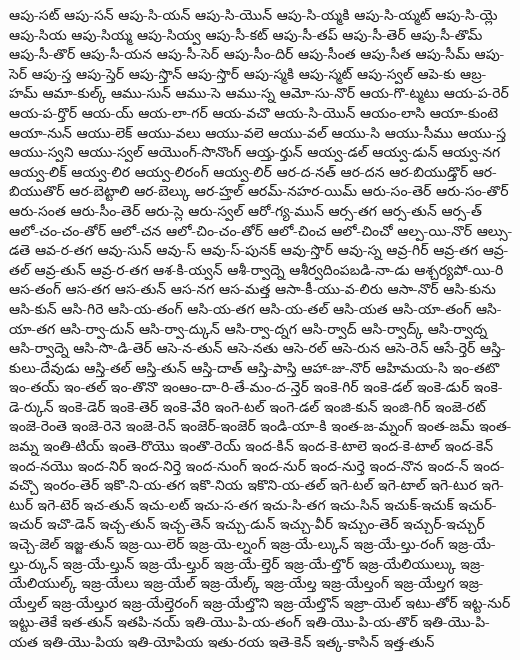 {ఆపు-సట్
ఆపు-సన్
ఆపు-సి-యన్
ఆపు-సి-యొన్
ఆపు-సి-య్మకి
ఆపు-సి-య్మట్
ఆపు-సి-య్లె
ఆపు-సియ
ఆపు-సియ్మ
ఆపు-సియ్వ
ఆపు-సీ-కట్
ఆపు-సీ-తప్
ఆపు-సీ-తెర్
ఆపు-సీ-తొమ్
ఆపు-సీ-తొర్
ఆపు-సీ-యన
ఆపు-సీ-సెర్
ఆపు-సీం-దిర్
ఆపు-సీంత
ఆపు-సీత
ఆపు-సీమ్
ఆపు-సెర్
ఆపు-స్త
ఆపు-స్తెర్
ఆపు-స్తొన్
ఆపు-స్తొర్
ఆపు-స్మకి
ఆపు-స్మట్
ఆపు-స్వల్
ఆపె-కు
ఆబ్ర-హమ్
ఆమా-కుల్క్
ఆము-సున్
ఆము-సె
ఆము-స్న
ఆమో-సు-నొర్
ఆయ-గొ-ట్మటు
ఆయ-ప-రెర్
ఆయ-ప-ర్తొర్
ఆయ-య్
ఆయ-లా-గర్
ఆయ-వచొ
ఆయ-సి-యొన్
ఆయం-లాసి
ఆయా-కుంటె
ఆయా-నున్
ఆయు-లెక్
ఆయు-వలు
ఆయు-వలె
ఆయు-వల్
ఆయు-సి
ఆయు-సీము
ఆయు-స్త
ఆయు-స్వని
ఆయు-స్వల్
ఆయొంగ్-సొనొంగ్
ఆయ్త-ర్తున్
ఆయ్వ-డల్
ఆయ్వ-డున్
ఆయ్వ-నగ
ఆయ్వ-లిక్
ఆయ్వ-లిర
ఆయ్వ-లిరంగ్
ఆయ్వ-లిర్
ఆర-ద-నత్
ఆర-దన
ఆర-బియుడ్తొర్
ఆర-బియుతొర్
ఆర-బెట్టాలి
ఆర-బెల్కు
ఆర-హ్తల్
ఆరమ్-నహర-యిమ్
ఆరు-సం-తెర్
ఆరు-సం-తొర్
ఆరు-సంత
ఆరు-సీం-తెర్
ఆరు-స్లె
ఆరు-స్వల్
ఆరో-గ్య-మున్
ఆర్స-తగ
ఆర్స-తున్
ఆర్స-త్
ఆలో-చం-చం-తోర్
ఆలో-చన
ఆలో-చిం-చం-తోర్
ఆలో-చించ
ఆలో-చించో
ఆల్ప-యి-నొర్
ఆల్సు-డతె
ఆవ-ర-తగ
ఆవు-సున్
ఆవు-స్
ఆవు-స్-పునక్
ఆవు-స్తొర్
ఆవు-స్న
ఆవ్ర-గిర్
ఆవ్ర-తగ
ఆవ్ర-తల్
ఆవ్ర-తున్
ఆవ్ర-ర-తగ
ఆశ-కి-య్వన్
ఆశీ-ర్వాద్నె
ఆశీర్వదింపబడి-నా-డు
ఆశ్చర్యపో-యి-రి
ఆస-తంగ్
ఆస-తగ
ఆస-తున్
ఆస-నగ
ఆస-మత్త
ఆసా-కీ-యు-వ-లిరు
ఆసా-నొర్
ఆసి-కును
ఆసి-కున్
ఆసి-గిరె
ఆసి-య-తంగ్
ఆసి-య-తగ
ఆసి-య-తల్
ఆసి-యత
ఆసి-యా-తంగ్
ఆసి-యా-తగ
ఆసి-ర్వా-దున్
ఆసి-ర్వా-ద్కున్
ఆసి-ర్వా-ద్నగ
ఆసి-ర్వాద్
ఆసి-ర్వాద్క్
ఆసి-ర్వాద్న
ఆసి-ర్వాద్నె
ఆసి-సొ-డి-తెర్
ఆసె-న-తున్
ఆసె-నతు
ఆసె-రల్
ఆసె-రున
ఆసె-రెన్
ఆసే-ర్తెర్
ఆస్తి-కులు-దేవుడు
ఆస్తి-తల్
ఆస్తి-తున్
ఆస్తి-దాత్
ఆస్తి-పాస్తి
ఆహా-జు-నొర్
ఆహిమయ-సి
ఇం-తటొ
ఇం-తయ్
ఇం-తల్
ఇం-తొనొ
ఇంఆం-దా-రి-తే-మం-ద-న్తెర్
ఇంకె-గిర్
ఇంకె-డల్
ఇంకె-డుర్
ఇంకె-డె-ర్కున్
ఇంకె-డెర్
ఇంకె-తెర్
ఇంకె-వేరి
ఇంగె-టల్
ఇంగె-డల్
ఇంజి-కున్
ఇంజి-గిర్
ఇంజె-రట్
ఇంజె-రెంతె
ఇంజె-రెనె
ఇంజె-రెన్
ఇంజెర్-ఇంజెర్
ఇండి-యా-కి
ఇంత-జ-మ్నంగ్
ఇంత-జమ్
ఇంత-జమ్న
ఇంతి-టియ్
ఇంతె-రొయొ
ఇంతొ-రెయ్
ఇంద-కిన్
ఇంద-కె-టాలె
ఇంద-కె-టాల్
ఇంద-కెన్
ఇంద-నయొ
ఇంద-నిర్
ఇంద-నిర్తె
ఇంద-నుంగ్
ఇంద-నుర్
ఇంద-నుర్తె
ఇంద-నొన
ఇంద-న్
ఇంద-వచ్చొ
ఇంరం-తెర్
ఇకొ-ని-య-తగ
ఇకొ-నియ
ఇకొని-య-తల్
ఇగె-టల్
ఇగె-టాల్
ఇగె-టుర
ఇగె-టుర్
ఇగె-టెర్
ఇచ-తున్
ఇచు-లట్
ఇచు-స-తగ
ఇచు-సి-తగ
ఇచు-సిన్
ఇచుక్-ఇచుక్
ఇచుర్-ఇచుర్
ఇచొ-డెన్
ఇచ్చ-తున్
ఇచ్చ-తెన్
ఇచ్చు-డున్
ఇచ్చు-వీర్
ఇచ్చుం-తెర్
ఇచ్చుర్-ఇచ్చుర్
ఇచ్చె-జెల్
ఇజ్జ-తున్
ఇజ్ర-యి-లెర్
ఇజ్ర-యె-ల్నంగ్
ఇజ్ర-యే-ల్కున్
ఇజ్ర-యే-ల్తు-రంగ్
ఇజ్ర-యే-ల్తు-ర్కున్
ఇజ్ర-యే-ల్తున్
ఇజ్ర-యే-ల్తుర్
ఇజ్ర-యే-ల్తెర్
ఇజ్ర-యే-ల్తొర్
ఇజ్ర-యేలియుల్కు
ఇజ్ర-యేలియుల్క్
ఇజ్ర-యేలు
ఇజ్ర-యేల్
ఇజ్ర-యేల్క్
ఇజ్ర-యేల్త
ఇజ్ర-యేల్తంగ్
ఇజ్ర-యేల్తగ
ఇజ్ర-యేల్తల్
ఇజ్ర-యేల్తుర
ఇజ్ర-యేల్తెరంగ్
ఇజ్ర-యేల్తొని
ఇజ్ర-యేల్తొన్
ఇజ్రా-యెల్
ఇటు-తోర్
ఇట్ట-నుర్
ఇట్టు-తెకే
ఇత-తున్
ఇతపి-నయ్
ఇతి-యొ-పి-య-తంగ్
ఇతి-యొ-పి-య-తొర్
ఇతి-యొ-పి-యత
ఇతి-యొ-పియ
ఇతి-యోపియ
ఇతు-రయ
ఇతె-కెన్
ఇత్క-కాసిన్
ఇత్త-తున్
}
